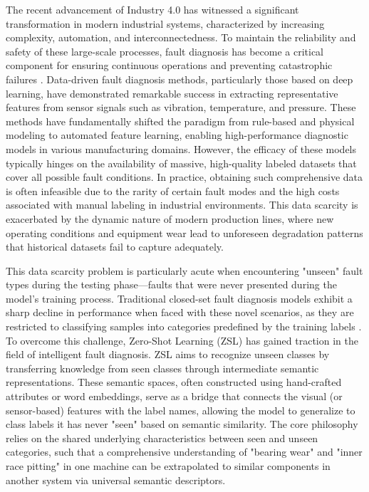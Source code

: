 The recent advancement of Industry 4.0 has witnessed a significant transformation in modern industrial systems, characterized by increasing complexity, automation, and interconnectedness. To maintain the reliability and safety of these large-scale processes, fault diagnosis has become a critical component for ensuring continuous operations and preventing catastrophic failures \cite{Lei2020, Zhao2019, Jiao2022}. Data-driven fault diagnosis methods, particularly those based on deep learning, have demonstrated remarkable success in extracting representative features from sensor signals such as vibration, temperature, and pressure. These methods have fundamentally shifted the paradigm from rule-based and physical modeling to automated feature learning, enabling high-performance diagnostic models in various manufacturing domains. However, the efficacy of these models typically hinges on the availability of massive, high-quality labeled datasets that cover all possible fault conditions. In practice, obtaining such comprehensive data is often infeasible due to the rarity of certain fault modes and the high costs associated with manual labeling in industrial environments. This data scarcity is exacerbated by the dynamic nature of modern production lines, where new operating conditions and equipment wear lead to unforeseen degradation patterns that historical datasets fail to capture adequately.

This data scarcity problem is particularly acute when encountering "unseen" fault types during the testing phase—faults that were never presented during the model's training process. Traditional closed-set fault diagnosis models exhibit a sharp decline in performance when faced with these novel scenarios, as they are restricted to classifying samples into categories predefined by the training labels \cite{Gao2020, Xu2021, Lampert2014, Xian2018}. To overcome this challenge, Zero-Shot Learning (ZSL) has gained traction in the field of intelligent fault diagnosis. ZSL aims to recognize unseen classes by transferring knowledge from seen classes through intermediate semantic representations. These semantic spaces, often constructed using hand-crafted attributes or word embeddings, serve as a bridge that connects the visual (or sensor-based) features with the label names, allowing the model to generalize to class labels it has never "seen" based on semantic similarity. The core philosophy relies on the shared underlying characteristics between seen and unseen categories, such that a comprehensive understanding of "bearing wear" and "inner race pitting" in one machine can be extrapolated to similar components in another system via universal semantic descriptors.

